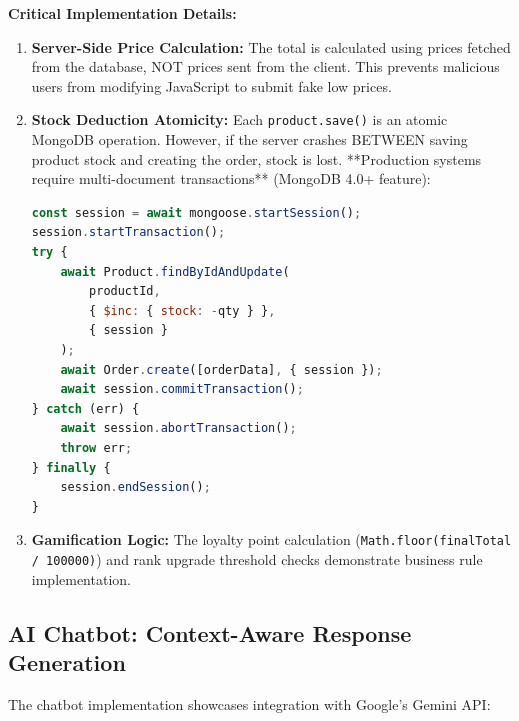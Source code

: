 \textbf{Critical Implementation Details:}

\begin{enumerate}
    \item \textbf{Server-Side Price Calculation:} The total is calculated using prices fetched from the database, NOT prices sent from the client. This prevents malicious users from modifying JavaScript to submit fake low prices.
    
    \item \textbf{Stock Deduction Atomicity:} Each \texttt{product.save()} is an atomic MongoDB operation. However, if the server crashes BETWEEN saving product stock and creating the order, stock is lost. **Production systems require multi-document transactions** (MongoDB 4.0+ feature):
    
    \begin{lstlisting}[language=JavaScript, caption=Transaction-Based Implementation (Future Enhancement)]
const session = await mongoose.startSession();
session.startTransaction();
try {
    await Product.findByIdAndUpdate(
        productId, 
        { $inc: { stock: -qty } },
        { session }
    );
    await Order.create([orderData], { session });
    await session.commitTransaction();
} catch (err) {
    await session.abortTransaction();
    throw err;
} finally {
    session.endSession();
}
    \end{lstlisting}
    
    \item \textbf{Gamification Logic:} The loyalty point calculation (\texttt{Math.floor(finalTotal / 100000)}) and rank upgrade threshold checks demonstrate business rule implementation.
\end{enumerate}

\subsection{AI Chatbot: Context-Aware Response Generation}

The chatbot implementation showcases integration with Google's Gemini API:

